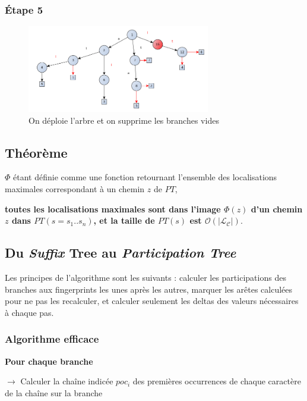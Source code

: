 \documentclass[a4paper]{article}
\begin{document}
\subsubsection{Étape 5}

\begin{figure}[H]
\centering
\includegraphics[width=80mm]{./slides/img/construction-45.png}
\caption{On déploie l'arbre et on supprime les branches vides}
\label{overflow}
\end{figure}

\subsection{Théorème}

$\Phi$ étant définie comme une fonction retournant l'ensemble des localisations maximales correspondant à un chemin $z$ de $PT$, \newline

\textbf{toutes les localisations maximales sont dans l'image $\Phi(z)$ d'un chemin $z$ dans $PT(s = s_{1}..s_{n})$, et la taille de $PT(s)$ est $\mathcal{O}(|\mathcal{L}_{\mathcal{C}}|)$}.

\subsection{Du \emph{Suffix} Tree au \emph{Participation Tree}}

Les principes de l'algorithme sont les suivants : calculer les participations des branches aux fingerprints les unes après les autres, marquer les arêtes calculées pour ne pas les recalculer, et calculer seulement les deltas des valeurs nécessaires à chaque pas.

\subsubsection{Algorithme efficace}

\textbf{Pour chaque branche}

$\rightarrow$ Calculer la chaîne indicée $poc_i$ des premières occurrences de chaque caractère de la chaîne sur la branche
\end{document}
